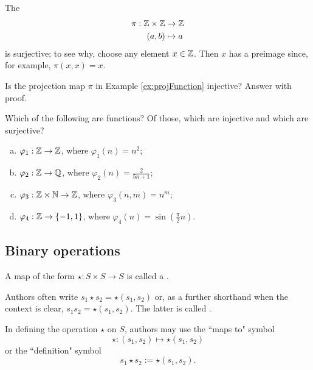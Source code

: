 \documentclass[../algebraNotesMSRI-UP2016.tex]{subfiles}
\begin{document}
\begin{frame}%
\begin{ex}\label{ex:projFunction}
The  
\begin{align*}
\pi: \mathbb Z\times \mathbb Z &\to \mathbb Z \\
 (a,b) &\mapsto a
\end{align*} 
is surjective; to see why, choose any element $x\in\mathbb Z$.  Then $x$ has a preimage since, for example, $\pi(x,x)=x$.    
\end{ex}

\smallGap
\begin{que}
Is the projection map $\pi$ in Example \ref{ex:projFunction} injective?  Answer with proof.
\end{que}
\end{frame}

\begin{frame}[c]
\begin{exe}[cf. Problem 38]\label{exe:functions}
Which of the following are functions?  Of those, which are injective and which are surjective?
\begin{enumerate}[(a)]
\item $\varphi_1:\mathbb Z\to \mathbb Z$, where $\varphi_1(n)=n^2$;
\item $\varphi_2:\mathbb Z\to \mathbb Q$, where $\varphi_2(n)=\frac{2}{5n+1}$;
\item $\varphi_3:\mathbb Z\times \mathbb N\to \mathbb Z$, where $\varphi_3(n,m)=n^m$;
\item $\varphi_4:\mathbb Z\to\{-1,1\}$, where $\varphi_4(n)=\sin(\frac{\pi}{2}n)$.
\end{enumerate}
\end{exe}
\end{frame}

\subsection[\subsecname]{Binary operations}
\begin{frame}{\subsecname}
\begin{dfn}
A map of the form $\star:S\times S\to S$ is called a .
\end{dfn}

\smallGap
Authors often write $s_1\star s_2=\star(s_1,s_2)$ or, as a further shorthand when the context is clear, $s_1s_2=\star(s_1,s_2)$.  The latter is called .  

\smallGap
In defining the operation $\star$ on $S$, authors may use the ``maps to" symbol  
\[
\star:(s_1,s_2)\mapsto \star{(s_1,s_2)}
\]
or the ``definition" symbol
\[
s_1\star s_2:= \star{(s_1,s_2)}.
\]
\end{frame}
\end{document}
